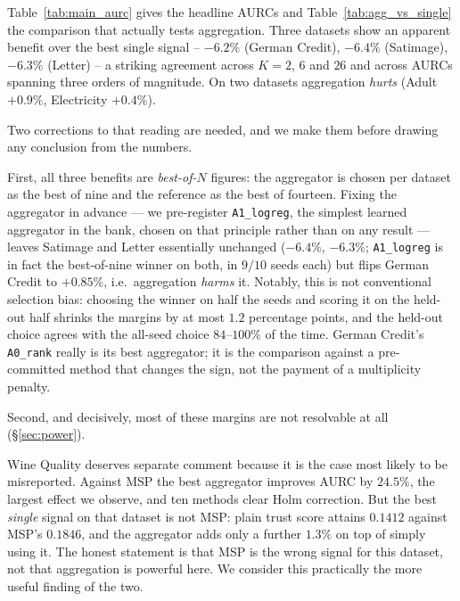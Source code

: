 \documentclass[conference]{IEEEtran}
\begin{document}
Table~\ref{tab:main_aurc} gives the headline AURCs and
Table~\ref{tab:agg_vs_single} the comparison that actually tests
aggregation. Three datasets show an apparent benefit over the best single
signal -- $-6.2\%$ (German Credit), $-6.4\%$ (Satimage), $-6.3\%$ (Letter)
-- a striking agreement across $K{=}2$, $6$ and $26$ and across AURCs
spanning three orders of magnitude. On two datasets aggregation
\emph{hurts} (Adult $+0.9\%$, Electricity $+0.4\%$).

Two corrections to that reading are needed, and we make them before
drawing any conclusion from the numbers.

First, all three benefits are \emph{best-of-}$N$ figures: the aggregator
is chosen per dataset as the best of nine and the reference as the best of
fourteen. Fixing the aggregator in advance --- we pre-register
\texttt{A1\_logreg}, the simplest learned aggregator in the bank, chosen
on that principle rather than on any result --- leaves Satimage and Letter
essentially unchanged ($-6.4\%$, $-6.3\%$; \texttt{A1\_logreg} is in fact
the best-of-nine winner on both, in $9/10$ seeds each) but flips German
Credit to $+0.85\%$, i.e.\ aggregation \emph{harms} it. Notably, this is
not conventional selection bias: choosing the winner on half the seeds
and scoring it on the held-out half shrinks the margins by at most
$1.2$ percentage points, and the held-out choice agrees with the
all-seed choice $84$--$100\%$ of the time. German Credit's
\texttt{A0\_rank} really is its best aggregator; it is the comparison
against a pre-committed method that changes the sign, not the payment of
a multiplicity penalty.

Second, and decisively, most of these margins are not resolvable at all
(\S\ref{sec:power}).

Wine Quality deserves separate comment because it is the case most likely
to be misreported. Against MSP the best aggregator improves AURC by
$24.5\%$, the largest effect we observe, and ten methods clear
Holm correction. But the best \emph{single} signal on that dataset is not
MSP: plain trust score attains $0.1412$ against MSP's $0.1846$, and the
aggregator adds only a further $1.3\%$ on top of simply using it. The
honest statement is that MSP is the wrong signal for this dataset, not
that aggregation is powerful here. We consider this practically the more
useful finding of the two.
\end{document}
